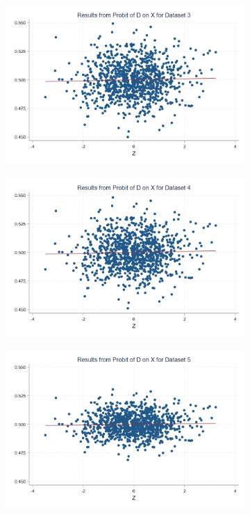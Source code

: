 \documentclass{article}
\begin{document}
\begin{solution}
\begin{figure}[H]
\begin{subfigure}[b]{0.43\textwidth}
    \end{subfigure}
    \begin{subfigure}[b]{0.43\textwidth}
        \centering
        \includegraphics[width=\textwidth]{ps2Heckman/figures/q8_parta_d3.png}
    \end{subfigure}
    \begin{subfigure}[b]{0.43\textwidth}
        \centering
        \includegraphics[width=\textwidth]{ps2Heckman/figures/q8_parta_d4.png}
    \end{subfigure}
    \begin{subfigure}[b]{0.43\textwidth}
        \centering
        \includegraphics[width=\textwidth]{ps2Heckman/figures/q8_parta_d5.png}

\end{subfigure}
\end{figure}
\end{solution}
\end{document}
